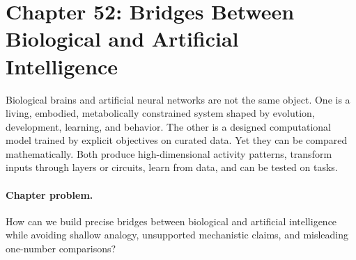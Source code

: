 \section{Chapter 52: Bridges Between Biological and Artificial Intelligence}
\label{ch:bridges-biological-artificial-intelligence}

Biological brains and artificial neural networks are not the same object. One is a living, embodied, metabolically constrained system shaped by evolution, development, learning, and behavior. The other is a designed computational model trained by explicit objectives on curated data. Yet they can be compared mathematically. Both produce high-dimensional activity patterns, transform inputs through layers or circuits, learn from data, and can be tested on tasks.

\paragraph{Chapter problem.}
How can we build precise bridges between biological and artificial intelligence while avoiding shallow analogy, unsupported mechanistic claims, and misleading one-number comparisons?

